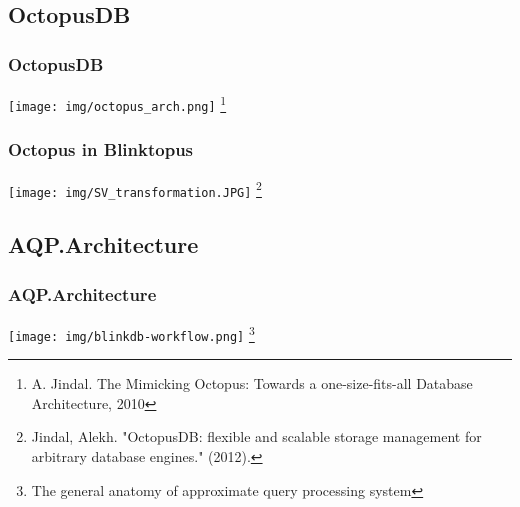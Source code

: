 \documentclass{beamer}
\begin{document}
\subsection{OctopusDB}
\begin{frame}
\frametitle{OctopusDB}
\texttt{[image: img/octopus\_arch.png]}
\footnote{A. Jindal. The Mimicking Octopus: Towards a one-size-fits-all Database Architecture, 2010}
\end{frame}

\begin{frame}
\frametitle{Octopus in Blinktopus}
\texttt{[image: img/SV\_transformation.JPG]}
\footnote{Jindal, Alekh. "OctopusDB: flexible and scalable storage management for arbitrary database engines." (2012).}
\end{frame}

\subsection{AQP.Architecture}
\begin{frame}
\frametitle{AQP.Architecture}
\texttt{[image: img/blinkdb-workflow.png]}
\footnote{The general anatomy of approximate query processing system}
\end{frame}

\begin{comment}

\subsection{AQP.User Interface}
\begin{frame}
\frametitle{AQP.User Interface}
Usually receives queries and accuracy or latency requirements from the user together with the approximate answers and the error bounds (or accuracy guarantees). \\
\vspace{0.3 cm}
\texttt{[image: img/aqp\_ui.jpg]}
\end{frame}
\end{comment}
\end{document}
